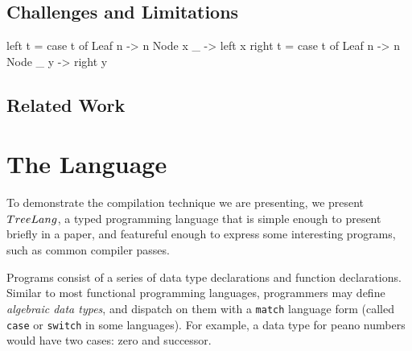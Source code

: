\documentclass[preprint,10pt,nocopyrightspace,nonatbib]{./bibs/sigplanconf}
\newif\ifcurly
\begin{document}

\subsection{Challenges and Limitations}



\ifcurly
\begin{code}[language=c]
fun left(t) {
  match(t) {
    Leaf(n):   return n;
    Node(x,_): return left(x);
  }}
fun right(t) {
  match(t) {
    Leaf(n):   return n;
    Node(_,y): return right(y);
  }}
\end{code}
\else
\begin{code}
 left t = case t of
            Leaf n   -> n
            Node x _ -> left x
 right t = case t of
             Leaf n   -> n
             Node _ y -> right y
\end{code}
\fi


\subsection{Related Work}




\section{The \treelang{} Language}


To demonstrate the compilation technique we are presenting, we present
$TreeLang{}$, a typed programming language that is simple enough to
present briefly in a paper, and featureful enough to express some
interesting programs, such as common compiler passes.

Programs consist of a series of data type declarations and function
declarations. Similar to most functional programming languages,
programmers may define \emph{algebraic data types}, and dispatch on
them with a \texttt{match} language form (called \texttt{case} or
\texttt{switch} in some languages). For example, a data type for peano
numbers would have two cases: zero and successor.
\end{document}
